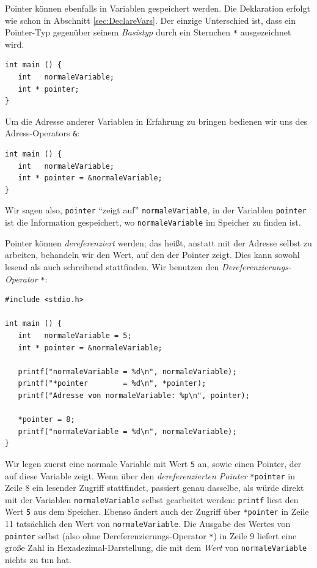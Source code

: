 Pointer können ebenfalls in Variablen gespeichert werden. Die Deklaration erfolgt wie schon in Abschnitt \ref{sec:DeclareVars}. Der einzige Unterschied ist, dass ein Pointer-Typ gegenüber seinem \emph{Basistyp} durch ein Sternchen \texttt{*} ausgezeichnet wird.

\begin{codebox}
\begin{verbatim}
int main () {
   int   normaleVariable;
   int * pointer;
}
\end{verbatim}
\end{codebox}

Um die Adresse anderer Variablen in Erfahrung zu bringen bedienen wir uns des Adress-Operators \texttt{\&}:

\begin{codebox}
\begin{verbatim}
int main () {
   int   normaleVariable;
   int * pointer = &normaleVariable;
}
\end{verbatim}
\end{codebox}

Wir sagen also, \texttt{pointer} \enquote{zeigt auf} \texttt{normaleVariable}, \ie in der Variablen \texttt{pointer} ist die Information gespeichert, wo \texttt{normaleVariable} im Speicher zu finden ist.

Pointer können \emph{dereferenziert} werden; das heißt, anstatt mit der Adresse selbst zu arbeiten, behandeln wir den Wert, auf den der Pointer zeigt. Dies kann sowohl lesend als auch schreibend stattfinden. Wir benutzen den \emph{Dereferenzierungs-Operator} \texttt{*}:

\begin{codebox}
\begin{verbatim}
#include <stdio.h>

int main () {
   int   normaleVariable = 5;
   int * pointer = &normaleVariable;
   
   printf("normaleVariable = %d\n", normaleVariable);
   printf("*pointer        = %d\n", *pointer);
   printf("Adresse von normaleVariable: %p\n", pointer);

   *pointer = 8;
   printf("normaleVariable = %d\n", normaleVariable);
}
\end{verbatim}
\end{codebox}

Wir legen zuerst eine normale Variable mit Wert \texttt{5} an, sowie einen Pointer, der auf diese Variable zeigt. Wenn über den \emph{dereferenzierten Pointer} \texttt{*pointer} in Zeile 8 ein lesender Zugriff stattfindet, passiert genau dasselbe, als würde direkt mit der Variablen \texttt{normaleVariable} selbst gearbeitet werden: \texttt{printf} liest den Wert \texttt{5} aus dem Speicher.
Ebenso ändert auch der Zugriff über \texttt{*pointer} in Zeile 11 tatsächlich den Wert von \texttt{normaleVariable}. Die Ausgabe des Wertes von \texttt{pointer} selbst (also ohne Dereferenzierungs-Operator \texttt{*}) in Zeile 9 liefert eine große Zahl in Hexadezimal-Darstellung, die mit dem \emph{Wert} von \texttt{normaleVariable} nichts zu tun hat.

